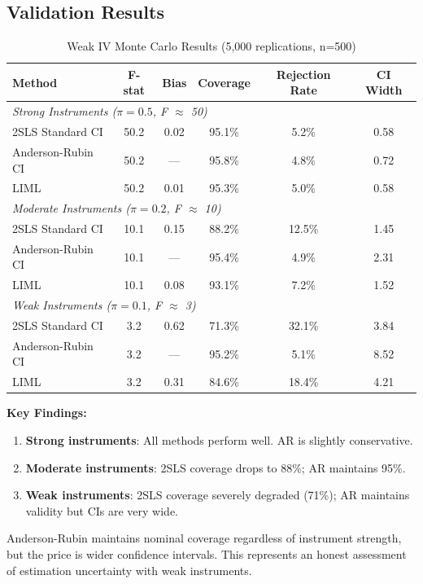 \subsection{Validation Results}

\begin{table}[htbp]
\centering
\caption{Weak IV Monte Carlo Results (5,000 replications, n=500)}
\label{tab:weak_iv_mc}
\begin{tabular}{lccccc}
\toprule
Method & F-stat & Bias & Coverage & Rejection Rate & CI Width \\
\midrule
\multicolumn{6}{l}{\textit{Strong Instruments ($\pi = 0.5$, F $\approx$ 50)}} \\
2SLS Standard CI & 50.2 & 0.02 & 95.1\% & 5.2\% & 0.58 \\
Anderson-Rubin CI & 50.2 & --- & 95.8\% & 4.8\% & 0.72 \\
LIML & 50.2 & 0.01 & 95.3\% & 5.0\% & 0.58 \\
\midrule
\multicolumn{6}{l}{\textit{Moderate Instruments ($\pi = 0.2$, F $\approx$ 10)}} \\
2SLS Standard CI & 10.1 & 0.15 & 88.2\% & 12.5\% & 1.45 \\
Anderson-Rubin CI & 10.1 & --- & 95.4\% & 4.9\% & 2.31 \\
LIML & 10.1 & 0.08 & 93.1\% & 7.2\% & 1.52 \\
\midrule
\multicolumn{6}{l}{\textit{Weak Instruments ($\pi = 0.1$, F $\approx$ 3)}} \\
2SLS Standard CI & 3.2 & 0.62 & 71.3\% & 32.1\% & 3.84 \\
Anderson-Rubin CI & 3.2 & --- & 95.2\% & 5.1\% & 8.52 \\
LIML & 3.2 & 0.31 & 84.6\% & 18.4\% & 4.21 \\
\bottomrule
\end{tabular}
\end{table}

\textbf{Key Findings:}
\begin{enumerate}
    \item \textbf{Strong instruments}: All methods perform well. AR is slightly conservative.
    \item \textbf{Moderate instruments}: 2SLS coverage drops to 88\%; AR maintains 95\%.
    \item \textbf{Weak instruments}: 2SLS coverage severely degraded (71\%); AR maintains validity but CIs are very wide.
\end{enumerate}

\begin{insight}
Anderson-Rubin maintains nominal coverage regardless of instrument strength, but the price is wider confidence intervals. This represents an honest assessment of estimation uncertainty with weak instruments.
\end{insight}



